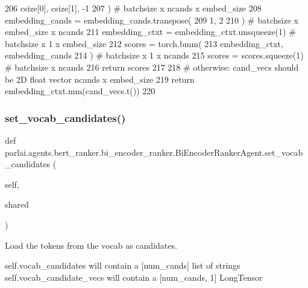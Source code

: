 \begin{DoxyCode}
206                 csize[0], csize[1], -1
207             )  \textcolor{comment}{# batchsize x ncands x embed\_size}
208             embedding\_cands = embedding\_cands.transpose(
209                 1, 2
210             )  \textcolor{comment}{# batchsize x embed\_size x ncands}
211             embedding\_ctxt = embedding\_ctxt.unsqueeze(1)  \textcolor{comment}{# batchsize x 1 x embed\_size}
212             scores = torch.bmm(
213                 embedding\_ctxt, embedding\_cands
214             )  \textcolor{comment}{# batchsize x 1 x ncands}
215             scores = scores.squeeze(1)  \textcolor{comment}{# batchsize x ncands}
216             \textcolor{keywordflow}{return} scores
217 
218         \textcolor{comment}{# otherwise: cand\_vecs should be 2D float vector ncands x embed\_size}
219         \textcolor{keywordflow}{return} embedding\_ctxt.mm(cand\_vecs.t())
220 
\end{DoxyCode}
\mbox{\label{classparlai_1_1agents_1_1bert__ranker_1_1bi__encoder__ranker_1_1BiEncoderRankerAgent_acdfa23a21c8364e7205093a5af51264f}} 
\subsubsection{\texorpdfstring{set\+\_\+vocab\+\_\+candidates()}{set\_vocab\_candidates()}}
{\footnotesize\ttfamily def parlai.\+agents.\+bert\+\_\+ranker.\+bi\+\_\+encoder\+\_\+ranker.\+Bi\+Encoder\+Ranker\+Agent.\+set\+\_\+vocab\+\_\+candidates (\begin{DoxyParamCaption}\item[{}]{self,  }\item[{}]{shared }\end{DoxyParamCaption})}

\begin{DoxyVerb}Load the tokens from the vocab as candidates.

self.vocab_candidates will contain a [num_cands] list of strings
self.vocab_candidate_vecs will contain a [num_cands, 1] LongTensor
\end{DoxyVerb}
 

